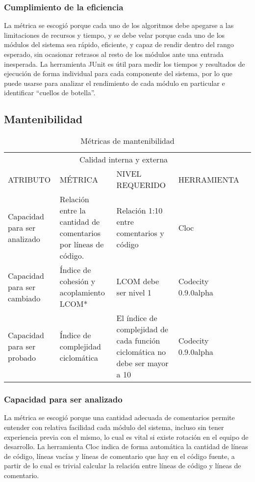 \documentclass[12pt]{article}
\begin{document}
\subsubsection{Cumplimiento de la eficiencia}
\vspace*{0.1in}
La métrica se escogió porque cada uno de los algoritmos debe apegarse a las limitaciones de recursos y tiempo, y se debe velar porque cada uno de los módulos del sistema sea rápido, eficiente, y capaz de rendir dentro del rango esperado, sin ocasionar retrasos al resto de los módulos ante una entrada inesperada. La herramienta JUnit es útil para medir los tiempos y resultados de ejecución de forma individual para cada componente del sistema, por lo que puede usarse para analizar el rendimiento de cada módulo en particular e identificar “cuellos de botella”.


\vspace*{0.3in}
\subsection{Mantenibilidad}%
\vspace*{0.3in}
\begin{table}[htb]%
\centering
\begin{tabular}{|p{4cm}|p{4cm}|p{4cm}|p{4cm}|p{4cm}|}
\hline
\multicolumn{4}{|c|}{Calidad interna y externa   } \\
\cline{1-4}
ATRIBUTO & MÉTRICA & NIVEL REQUERIDO & HERRAMIENTA\\
\hline \hline
Capacidad para ser analizado 
& Relación entre la cantidad de comentarios por líneas de código.
& Relación 1:10 entre comentarios y código
& Cloc\\ \cline{1-4}
\hline
Capacidad para ser cambiado 
& Índice de cohesión y acoplamiento LCOM*
& LCOM debe ser nivel 1
& Codecity 0.9.0alpha\\ \cline{1-4}
\hline
Capacidad para ser probado
& Índice de complejidad ciclomática
& El índice de complejidad de cada función ciclomática no debe ser mayor a 10 
& Codecity 0.9.0alpha\\ \cline{1-4}
\hline
\end{tabular}
\caption{Métricas de mantenibilidad}
\label{tabla:final}
\end{table}%
\vspace*{0.3in}
\subsubsection{Capacidad para ser analizado}
\vspace*{0.1in}
La métrica se escogió porque una cantidad adecuada de comentarios permite entender con relativa facilidad cada módulo del sistema, incluso sin tener experiencia previa con el mismo, lo cual es vital si existe rotación en el equipo de desarrollo. La herramienta Cloc indica de forma automática la cantidad de líneas de código, líneas vacías y líneas de comentario que hay en el código fuente, a partir de lo cual es trivial calcular la relación entre líneas de código y líneas de comentario.
\vspace*{0.3in}
\end{document}
